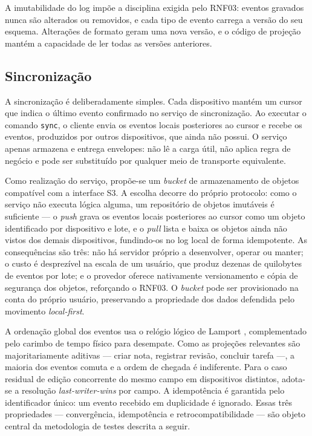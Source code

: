 \documentclass[12pt, %
openright, 
oneside,
a4paper,
english,   %
brazil]{facom-ufu-abntex2}
\begin{document}
A imutabilidade do log impõe a disciplina exigida pelo RNF03: eventos gravados
nunca são alterados ou removidos, e cada tipo de evento carrega a versão do seu
esquema. Alterações de formato geram uma nova versão, e o código de projeção
mantém a capacidade de ler todas as versões anteriores.

\subsection{Sincronização}
\label{sub:sincronizacao}

A sincronização é deliberadamente simples. Cada dispositivo mantém um cursor
que indica o último evento confirmado no serviço de sincronização. Ao executar
o comando \texttt{sync}, o cliente envia os eventos locais posteriores ao
cursor e recebe os eventos, produzidos por outros dispositivos, que ainda não
possui. O serviço apenas armazena e entrega envelopes: não lê a carga útil,
não aplica regra de negócio e pode ser substituído por qualquer meio de
transporte equivalente.

Como realização do serviço, propõe-se um \textit{bucket} de armazenamento de
objetos compatível com a interface S3. A escolha decorre do próprio
protocolo: como o serviço não executa lógica alguma, um repositório de
objetos imutáveis é suficiente --- o \textit{push} grava os eventos locais
posteriores ao cursor como um objeto identificado por dispositivo e lote, e
o \textit{pull} lista e baixa os objetos ainda não vistos dos demais
dispositivos, fundindo-os no log local de forma idempotente. As
consequências são três: não há servidor próprio a desenvolver, operar ou
manter; o custo é desprezível na escala de um usuário, que produz dezenas de
quilobytes de eventos por lote; e o provedor oferece nativamente
versionamento e cópia de segurança dos objetos, reforçando o RNF03. O
\textit{bucket} pode ser provisionado na conta do próprio usuário,
preservando a propriedade dos dados defendida pelo movimento
\textit{local-first}.

A ordenação global dos eventos usa o relógio lógico de Lamport
\cite{Lamport1978}, complementado pelo carimbo de tempo físico para
desempate. Como as projeções relevantes são majoritariamente aditivas ---
criar nota, registrar revisão, concluir tarefa ---, a maioria dos eventos
comuta e a ordem de chegada é indiferente. Para o caso residual de edição
concorrente do mesmo campo em dispositivos distintos, adota-se a resolução
\textit{last-writer-wins} por campo. A idempotência é garantida pelo
identificador único: um evento recebido em duplicidade é ignorado. Essas três
propriedades --- convergência, idempotência e retrocompatibilidade --- são
objeto central da metodologia de testes descrita a seguir.
\end{document}
